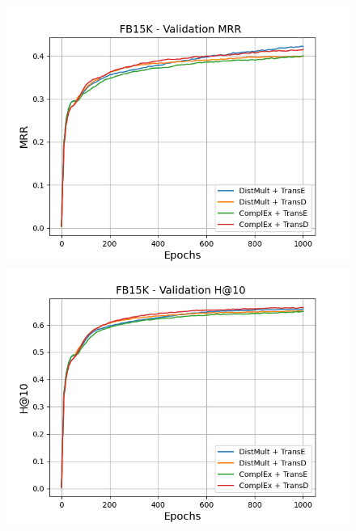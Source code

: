 \begin{figure}[H]
    \centering
    \begin{minipage}{.45\textwidth}
      \centering
      \includegraphics[width=0.9\linewidth]{figures/results/gan_train/not_pretrained/random/fb15k/1k_epochs/random_fb15k_mrrs.png}
    \end{minipage}%
    \begin{minipage}{.45\textwidth}
      \centering
      \includegraphics[width=0.9\linewidth]{figures/results/gan_train/not_pretrained/random/fb15k/1k_epochs/random_fb15k_hit10.png}
    \end{minipage}
    

\end{figure}
